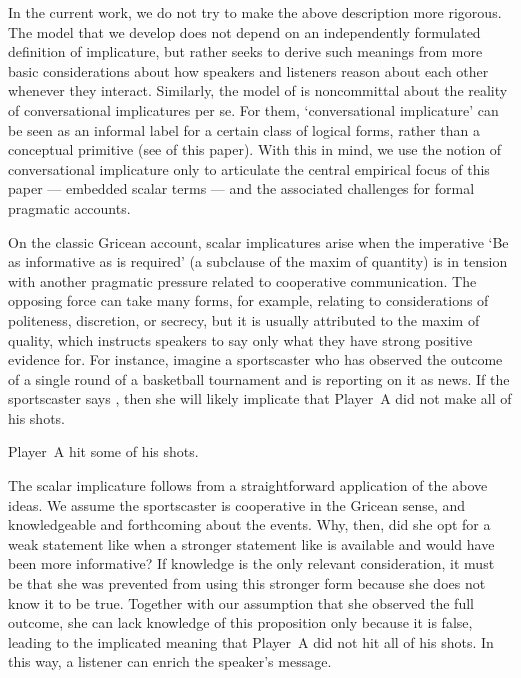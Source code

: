 \documentclass[leqno,12pt]{article}
\begin{document}
In the current work, we do not try to make the above description more
rigorous. The model that we develop does not depend on an
independently formulated definition of implicature, but rather seeks
to derive such meanings from more basic considerations about how
speakers and listeners reason about each other whenever they
interact. Similarly, the model of \citet{ChierchiaFoxSpector08} is
noncommittal about the reality of conversational implicatures per
se. For them, `conversational implicature' can be seen as an informal
label for a certain class of logical forms, rather than a conceptual
primitive (see  of this paper). With this in mind, we
use the notion of conversational implicature only to articulate the
central empirical focus of this paper --- embedded scalar terms ---
and the associated challenges for formal pragmatic accounts.

On the classic Gricean account, scalar implicatures arise when the
imperative `Be as informative as is required' (a subclause of the
maxim of quantity) is in tension with another pragmatic pressure
related to cooperative communication. The opposing force can take many
forms, for example, relating to considerations of politeness,
discretion, or secrecy, but it is usually attributed to the maxim of
quality, which instructs speakers to say only what they have strong
positive evidence for. For instance, imagine a sportscaster who has
observed the outcome of a single round of a basketball tournament and
is reporting on it as news. If the sportscaster says , then
she will likely implicate that Player~A did not make all of his shots.
%
\begin{examples}
\item\label{some} Player~A hit some of his shots.
\end{examples}

The scalar implicature follows from a straightforward application of
the above ideas. We assume the sportscaster is cooperative in the
Gricean sense, and knowledgeable and forthcoming about the
events. Why, then, did she opt for a weak statement like
 when a stronger statement like
 is available and would have been
more informative?  If knowledge is the only relevant consideration, it
must be that she was prevented from using this stronger form because
she does not know it to be true. Together with our assumption that she
observed the full outcome, she can lack knowledge of this proposition
only because it is false, leading to the implicated meaning that
Player~A did not hit all of his shots. In this way, a listener can
enrich the speaker's message.
\end{document}
